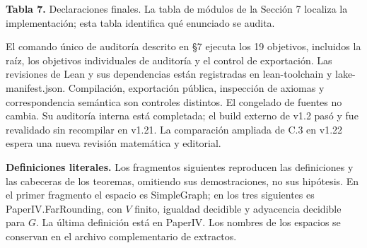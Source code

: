 \documentclass[spanish,11pt,a4paper]{article}
\begin{document}
\textbf{Tabla 7.} Declaraciones finales. La tabla de módulos de la Sección 7 localiza la implementación; esta tabla identifica qué enunciado se audita.

El comando único de auditoría descrito en §7 ejecuta los 19 objetivos, incluidos la raíz, los objetivos individuales de auditoría y el control de exportación. Las revisiones de Lean y sus dependencias están registradas en lean-toolchain y lake-manifest.json. Compilación, exportación pública, inspección de axiomas y correspondencia semántica son controles distintos. El congelado de fuentes no cambia. Su auditoría interna está completada; el build externo de v1.2 pasó y fue revalidado sin recompilar en v1.21. La comparación ampliada de C.3 en v1.22 espera una nueva revisión matemática y editorial.

\textbf{Definiciones literales.} Los fragmentos siguientes reproducen las definiciones y las cabeceras de los teoremas, omitiendo sus demostraciones, no sus hipótesis. En el primer fragmento el espacio es {\ttfamily\small SimpleGraph}; en los tres siguientes es {\ttfamily\small PaperIV.\discretionary{\hbox{\ensuremath{\hookrightarrow}}}{}{}FarRounding}, con \(V\) finito, igualdad decidible y adyacencia decidible para \(G\). La última definición está en {\ttfamily\small PaperIV}. Los nombres de los espacios se conservan en el archivo complementario de extractos.
\end{document}
